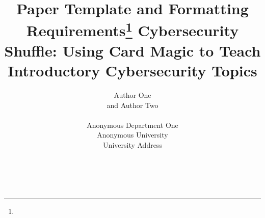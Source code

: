 \documentclass[article,twoside]{combine}
\title{Paper Template and Formatting Requirements\footnote{\protect}
}
\author{
Author One\affmark[1] \\  and Author Two\affmark[2] \\ \\

Anonymous Department One \\
Anonymous University \\
University Address \\
\email{authorone@anon.edu}\affmark[1] \\
\email{authortwo@anon.edu}\affmark[2] \\
}
\begin{document}
\title{Cybersecurity Shuffle: Using Card Magic to Teach Introductory Cybersecurity Topics}



\maketitle












\end{document}
